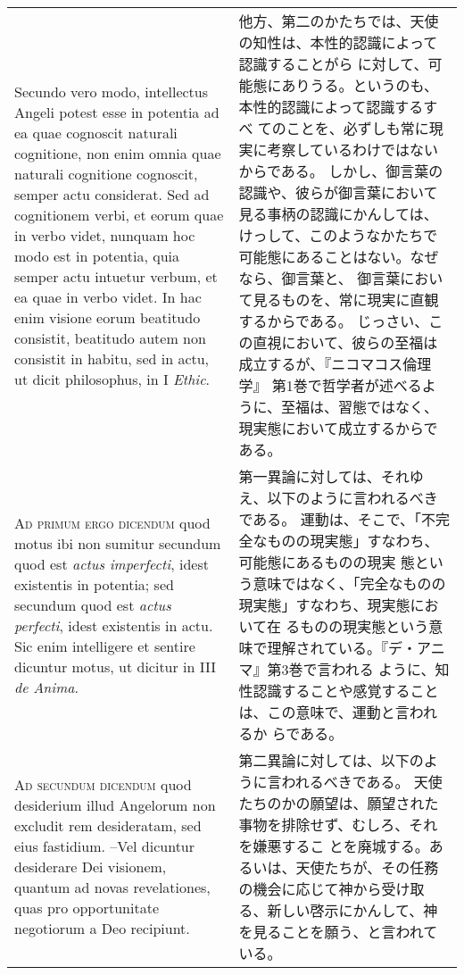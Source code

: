 \documentclass[10pt]{jsarticle} %
\begin{document}
\begin{longtable}{p{21em}p{21em}}
\\

 Secundo vero modo, intellectus Angeli potest esse
in potentia ad ea quae cognoscit naturali cognitione, non enim omnia
quae naturali cognitione cognoscit, semper actu considerat. Sed ad
cognitionem verbi, et eorum quae in verbo videt, nunquam hoc modo est in
potentia, quia semper actu intuetur verbum, et ea quae in verbo
videt. In hac enim visione eorum beatitudo consistit, beatitudo autem
non consistit in habitu, sed in actu, ut dicit philosophus, in I {\itshape Ethic}.


&

他方、第二のかたちでは、天使の知性は、本性的認識によって認識することがら
 に対して、可能態にありうる。というのも、本性的認識によって認識するすべ
 てのことを、必ずしも常に現実に考察しているわけではないからである。
しかし、御言葉の認識や、彼らが御言葉において見る事柄の認識にかんしては、
 けっして、このようなかたちで可能態にあることはない。なぜなら、御言葉と、
 御言葉において見るものを、常に現実に直観するからである。
じっさい、この直視において、彼らの至福は成立するが、『ニコマコス倫理学』
 第1巻で哲学者が述べるように、至福は、習態ではなく、
 現実態において成立するからである。


\\


{\scshape Ad primum ergo dicendum} quod motus ibi non
sumitur secundum quod est {\itshape actus imperfecti}, idest existentis in
potentia; sed secundum quod est {\itshape actus perfecti}, idest existentis in
actu. Sic enim intelligere et sentire dicuntur motus, ut dicitur in III
{\itshape de Anima}.


&

第一異論に対しては、それゆえ、以下のように言われるべきである。
運動は、そこで、「不完全なものの現実態」すなわち、可能態にあるものの現実
 態という意味ではなく、「完全なものの現実態」すなわち、現実態において在
 るものの現実態という意味で理解されている。『デ・アニマ』第3巻で言われる
 ように、知性認識することや感覚することは、この意味で、運動と言われるか
 らである。


\\


{\scshape Ad secundum dicendum} quod desiderium illud
Angelorum non excludit rem desideratam, sed eius fastidium. --Vel dicuntur
desiderare Dei visionem, quantum ad novas revelationes, quas pro
opportunitate negotiorum a Deo recipiunt.


&

第二異論に対しては、以下のように言われるべきである。
天使たちのかの願望は、願望された事物を排除せず、むしろ、それを嫌悪するこ
 とを廃城する。あるいは、天使たちが、その任務の機会に応じて神から受け取
 る、新しい啓示にかんして、神を見ることを願う、と言われている。



\end{longtable}
\end{document}
